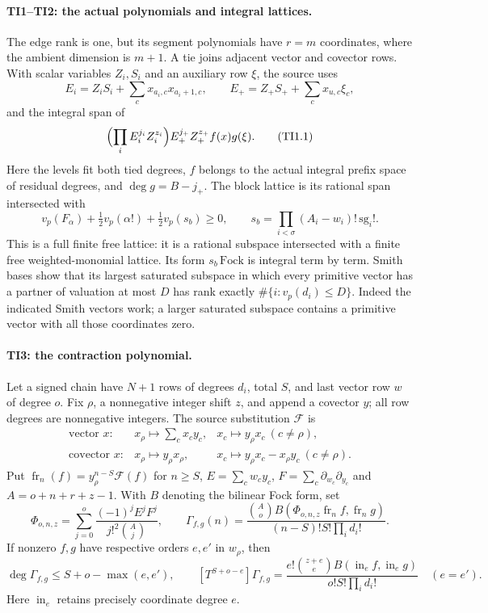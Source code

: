 \documentclass[11pt,a4paper]{article}
\numberwithin{equation}{section}
\theoremstyle{remark}\newtheorem{remark}[theorem]{Remark}
\begin{document}
\paragraph{TI1--TI2: the actual polynomials and integral lattices.}
The edge rank is one, but its segment polynomials have $r=m$ coordinates,
where the ambient dimension is $m+1$.  A tie joins adjacent vector and
covector rows.  With scalar variables $Z_i,S_i$ and an auxiliary row $\xi$,
the source uses
\[
 E_i=Z_iS_i+\sum_c x_{a_i,c}x_{a_i+1,c},\qquad
 E_+=Z_+S_++\sum_c x_{u,c}\xi_c,
\]
and the integral span of
\[
 \Bigl(\prod_iE_i^{j_i}Z_i^{z_i}\Bigr)E_+^{j_+}Z_+^{z_+}f(x)g(\xi).
 \tag{TI1.1}
\]
Here the levels fit both tied degrees, $f$ belongs to the actual integral
prefix space of residual degrees, and $\deg g=B-j_+$.
The block lattice is its rational span intersected with
\[
 v_p(F_\alpha)+\tfrac12v_p(\alpha!)+\tfrac12v_p(s_b)\geq0,
 \qquad s_b=\prod_{i<\sigma}(A_i-w_i)!\,\mathrm{sg}_i!.
 \tag{TI1.2}
\]
This is a full finite free lattice: it is a rational subspace intersected
with a finite free weighted-monomial lattice.  Its form $s_b\,\mathrm{Fock}$
is integral term by term.  Smith bases show that its largest saturated
subspace in which every primitive vector has a partner of valuation at
most $D$ has rank exactly $\#\{i:v_p(d_i)\leq D\}$.
Indeed the indicated Smith vectors work; a larger saturated subspace
contains a primitive vector with all those coordinates zero.

\paragraph{TI3: the contraction polynomial.}
Let a signed chain have $N+1$ rows of degrees $d_i$, total $S$, and last
vector row $w$ of degree $o$. Fix $\rho$, a nonnegative integer shift $z$,
and append a covector $y$; all row degrees are nonnegative integers.
The source substitution $\mathcal F$ is
\[
\begin{array}{lll}
\text{vector }x:&x_\rho\mapsto\sum_cx_cy_c,&x_c\mapsto y_\rho x_c\ (c\ne\rho),\\
\text{covector }x:&x_\rho\mapsto y_\rho x_\rho,
 &x_c\mapsto y_\rho x_c-x_\rho y_c\ (c\ne\rho).
\end{array}
\]
Put $\operatorname{fr}_n(f)=y_\rho^{n-S}\mathcal F(f)$ for $n\geq S$,
$E=\sum_cw_cy_c$, $F=\sum_c\partial_{w_c}\partial_{y_c}$ and
$A=o+n+r+z-1$.  With $B$ denoting the bilinear Fock form, set
\[
 \Phi_{o,n,z}=\sum_{j=0}^o\frac{(-1)^jE^jF^j}{j!^2\binom Aj},\qquad
 \Gamma_{f,g}(n)=
 \frac{\binom Ao B(\Phi_{o,n,z}\operatorname{fr}_n f,
                         \operatorname{fr}_n g)}
 {(n-S)!S!\prod_i d_i!}.
 \tag{TI3.1}
\]
If nonzero $f,g$ have respective orders $e,e'$ in $w_\rho$, then
\[
 \deg\Gamma_{f,g}\leq S+o-\max(e,e'),\qquad
 [T^{S+o-e}]\Gamma_{f,g}
 =\frac{e!\binom{z+e}e B(\operatorname{in}_ef,\operatorname{in}_eg)}
 {o!S!\prod_i d_i!}\quad(e=e').
 \tag{TI3.2}
\]
Here $\operatorname{in}_e$ retains precisely coordinate degree $e$.
\end{document}
